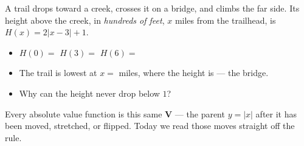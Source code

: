 \documentclass[10pt]{article}
\newcommand{\lgrid}[4]{%
  \draw[step=1, linegray!40, very thin] (#1,#3) grid (#2,#4);
  \draw[->, semithick, charcoal] (#1,0)--(#2,0) node[below right, font=\scriptsize]{$x$};
  \draw[->, semithick, charcoal] (0,#3)--(0,#4) node[left, font=\scriptsize]{$y$};}
\begin{document}
\begin{hookbox}
A trail drops toward a creek, crosses it on a bridge, and climbs the far side. Its height above
the creek, in \emph{hundreds of feet}, $x$ miles from the trailhead, is $H(x)=2|x-3|+1$.
\begin{center}
\begin{minipage}[c]{0.36\linewidth}\centering
{}
\end{minipage}\hfill
\begin{minipage}[c]{0.60\linewidth}
\begin{itemize}\setlength{\itemsep}{2pt}
  \item $H(0)=$  \quad $H(3)=$  \quad $H(6)=$ 
  \item The trail is lowest at $x=$  miles, where the height is 
        --- the bridge.
  \item Why can the height never drop below $1$? 
\end{itemize}
\end{minipage}
\end{center}
Every absolute value function is this same \textbf{V} --- the parent $y=|x|$ after it has been
moved, stretched, or flipped. Today we read those moves straight off the rule.
\end{hookbox}
\end{document}
